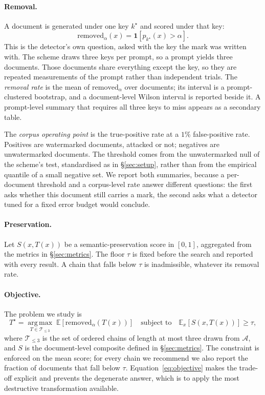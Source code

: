 \paragraph{Removal.}
A document is generated under one key $k^\star$ and scored under that key:
\begin{equation}
  \mathrm{removed}_\alpha(x) = \mathbf{1}\!\left[ p_{k^\star}(x) > \alpha \right].
  \label{eq:removed}
\end{equation}
This is the detector's own question, asked with the key the mark was written with. The scheme draws three keys per prompt, so a prompt yields three documents. Those documents share everything except the key, so they are repeated measurements of the prompt rather than independent trials. The \emph{removal rate} is the mean of $\mathrm{removed}_\alpha$ over documents; its interval is a prompt-clustered bootstrap, and a document-level Wilson interval is reported beside it. A prompt-level summary that requires all three keys to miss appears as a secondary table.

The \emph{corpus operating point} is the true-positive rate at a $1\%$ false-positive rate. Positives are watermarked documents, attacked or not; negatives are unwatermarked documents. The threshold comes from the unwatermarked null of the scheme's test, standardised as in \S\ref{sec:setup}, rather than from the empirical quantile of a small negative set. We report both summaries, because a per-document threshold and a corpus-level rate answer different questions: the first asks whether this document still carries a mark, the second asks what a detector tuned for a fixed error budget would conclude.

\paragraph{Preservation.}
Let $S(x, T(x))$ be a semantic-preservation score in $[0,1]$, aggregated from the metrics in \S\ref{sec:metrics}. The floor $\tau$ is fixed before the search and reported with every result. A chain that falls below $\tau$ is inadmissible, whatever its removal rate.

\paragraph{Objective.}
The problem we study is
\begin{equation}
  T^\star = \operatorname*{arg\,max}_{T \in \mathcal{T}_{\le 3}} \; \mathbb{E}\left[\mathrm{removed}_\alpha(T(x))\right]
  \quad \text{subject to} \quad
  \mathbb{E}_{x}\left[S(x, T(x))\right] \ge \tau ,
  \label{eq:objective}
\end{equation}
where $\mathcal{T}_{\le 3}$ is the set of ordered chains of length at most three drawn from $\mathcal{A}$, and $S$ is the document-level composite defined in \S\ref{sec:metrics}. The constraint is enforced on the mean score; for every chain we recommend we also report the fraction of documents that fall below $\tau$. Equation~\ref{eq:objective} makes the trade-off explicit and prevents the degenerate answer, which is to apply the most destructive transformation available.

